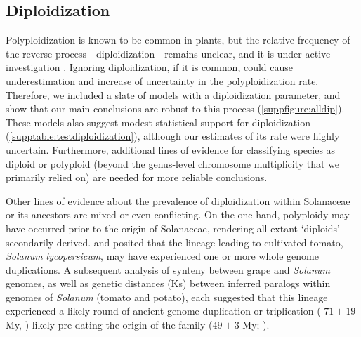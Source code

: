 
\subsection*{Diploidization}

Polyploidization is known to be common in plants, but the relative frequency of the reverse process---diploidization---remains unclear, and it is under active investigation \citep{dodsworth_2015,mandakova_2018}.
%
Ignoring diploidization, if it is common, could cause underestimation and increase of uncertainty in  the polyploidization rate. 
Therefore, we included a slate of models with a diploidization parameter, and show that our main conclusions are robust to this process (\cref{suppfigure:alldip}).
These models also suggest modest statistical support for diploidization (\cref{supptable:testdiploidization}), although our estimates of its rate were highly uncertain. 
Furthermore, additional lines of evidence for classifying species as diploid or polyploid (beyond the genus-level chromosome multiplicity that we primarily relied on) are needed for more reliable conclusions.

Other lines of evidence about the prevalence of diploidization within Solanaceae or its ancestors are mixed or even conflicting.
On the one hand, polyploidy may have occurred prior to the origin of Solanaceae, rendering all extant `diploids' secondarily derived.
 and \citet{blanc2004} posited that the lineage leading to cultivated tomato, \emph{Solanum lycopersicum}, may have experienced one or more whole genome duplications.
A subsequent analysis of synteny between grape and \emph{Solanum} genomes, as well as genetic distances (Ks) between inferred paralogs within genomes of \emph{Solanum} (tomato and potato), each suggested that this lineage experienced a likely round of ancient genome duplication or triplication ( $71 \pm 19$ My, \citet{tomato2012})  likely pre-dating the origin of the family ($49 \pm 3$ My; \citealt{sarkinen_2013}). 

